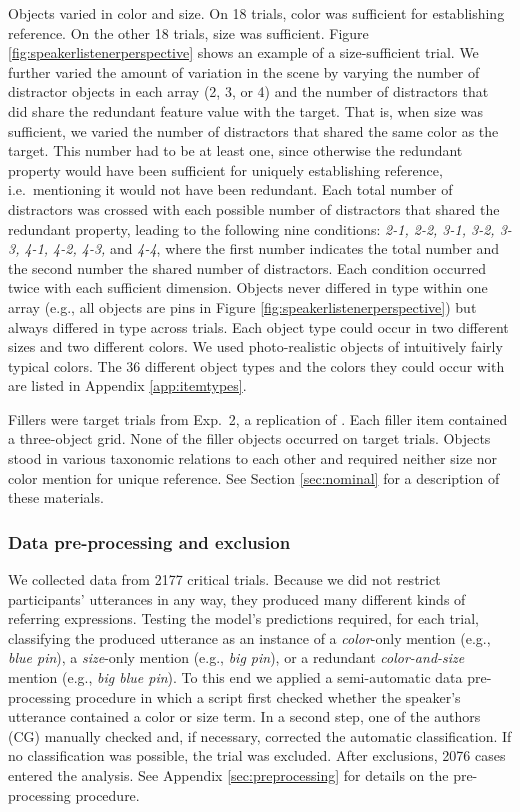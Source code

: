 \documentclass[11pt]{article}
\newcommand{\figref}[1]{Figure \ref{#1}}
\newcommand{\appref}[1]{Appendix \ref{#1}}
\newcommand{\sectionref}[1]{Section \ref{#1}}
\begin{document}
Objects varied in color and size. On 18 trials, color was sufficient for establishing reference. On the other 18 trials, size was sufficient. \figref{fig:speakerlistenerperspective} shows an example of a size-sufficient trial. We further varied the amount of variation in the scene by varying the number of distractor objects in each array (2, 3, or  4) and the number of distractors that did share the redundant feature value with the target. That is, when size was sufficient, we varied the number of distractors that shared the same color as the target. This number had to be at least one, since otherwise the redundant property would have been sufficient for uniquely establishing reference, i.e.~mentioning it would not have been redundant. Each total number of distractors was crossed with each possible number of distractors that shared the redundant property, leading to the following nine conditions: \emph{2-1, 2-2, 3-1, 3-2, 3-3, 4-1, 4-2, 4-3,} and \emph{4-4}, where the first number indicates the total number and the second number the shared number of distractors. Each condition occurred twice with each sufficient dimension. Objects never differed in type within one array (e.g., all objects are pins in \figref{fig:speakerlistenerperspective}) but always differed in type across trials. Each object type could occur in two different sizes and two different colors. We used photo-realistic objects of intuitively fairly typical colors. The 36 different object types and the colors they could occur with are listed in \appref{app:itemtypes}. 


Fillers were target trials from Exp.~2, a replication of . Each filler item contained a three-object grid. None of the filler objects occurred on target trials. Objects stood in various taxonomic relations to each other and required neither size nor color mention for unique reference. See \sectionref{sec:nominal} for a description of these materials.

\subsubsection{Data pre-processing and exclusion}

We collected data from 2177 critical trials. Because we did not restrict participants' utterances in any way, they produced many different kinds of referring expressions. Testing the model's predictions required, for each trial, classifying the produced utterance as an instance of a \emph{color}-only mention (e.g., \emph{blue pin}), a \emph{size}-only mention (e.g., \emph{big pin}), or a redundant \emph{color-and-size} mention (e.g., \emph{big blue pin}). To this end we applied a semi-automatic data pre-processing procedure in which a script first checked whether the speaker's utterance contained a color or size term. In a second step,  one of the authors (CG)  manually checked and, if necessary, corrected the automatic classification. If no classification was possible, the trial was excluded. After exclusions, 2076 cases entered the analysis.  See \appref{sec:preprocessing} for details on the pre-processing procedure.
\end{document}
